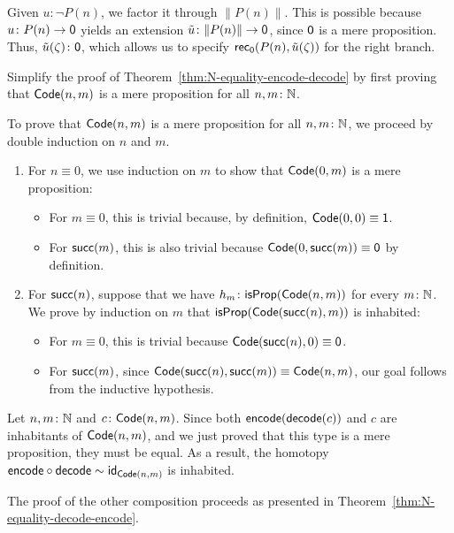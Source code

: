 \begin{solution}
\begin{description}[font=\normalfont\scshape]
        \item[Right branch:] Given $u\colon\neg P(n)$, we factor it through $\lVert P(n)\rVert$. This is possible because $u\colon P(n)\to\fun0$ yields an extension $\tilde u\colon\lVert P(n)\rVert\to\fun0$, since $\mathsf{0}$ is a mere proposition. Thus, $\tilde u(\zeta)\colon\fun0$, which allows us to specify $\mathsf{rec}_{\mathsf{0}}(P(n),\tilde u(\zeta))$ for the right branch.
    \end{description}
    
    
\end{solution}

\begin{exr}
    Simplify the proof of\/ {\upshape Theorem~\ref{thm:N-equality-encode-decode}} by first proving that\/ $\mathsf{Code}(n,m)$ is a mere proposition for all\/ $n,m\colon\N$.
\end{exr}

\begin{solution}
    To prove that $\mathsf{Code}(n,m)$ is a mere proposition for all $n,m\colon\N$, we proceed by double induction on $n$ and $m$.
    \begin{enumerate}[-]
        \item For $n\equiv0$, we use induction on $m$ to show that $\mathsf{Code}(0,m)$ is a mere proposition:
        \begin{itemize}
            \item For $m\equiv0$, this is trivial because, by definition, $\mathsf{Code}(0,0)\equiv\mathsf{1}$.
            \item For $\mathsf{succ}(m)$, this is also trivial because $\mathsf{Code}(0,\mathsf{succ}(m))\equiv\mathsf{0}$ by definition.
        \end{itemize}
        \item For $\mathsf{succ}(n)$, suppose that we have $h_m\colon\fun{isProp}(\fun{Code}(n,m))$ for every $m\colon\N$. We prove by induction on $m$ that $\mathsf{isProp}(\mathsf{Code}(\mathsf{succ}(n),m))$ is inhabited:
        \begin{itemize}
            \item For $m\equiv0$, this is trivial because $\mathsf{Code}(\mathsf{succ}(n),0)\equiv\mathsf{0}$.
            \item For $\mathsf{succ}(m)$, since $\mathsf{Code}(\mathsf{succ}(n),\mathsf{succ}(m))\equiv\mathsf{Code}(n,m)$, our goal follows from the inductive hypothesis.
        \end{itemize}
    \end{enumerate}
    
    Let $n,m\colon\N$ and $c\colon\fun{Code}(n,m)$. Since both $\mathsf{encode}(\mathsf{decode}(c))$ and $c$ are inhabitants of $\mathsf{Code}(n,m)$, and we just proved that this type is a mere proposition, they must be equal. As a result, the homotopy $\mathsf{encode}\circ\mathsf{decode}\sim\mathsf{id}_{\mathsf{Code}(n,m)}$ is inhabited.

    The proof of the other composition proceeds as presented in Theorem~\ref{thm:N-equality-decode-encode}.
    
\end{solution}